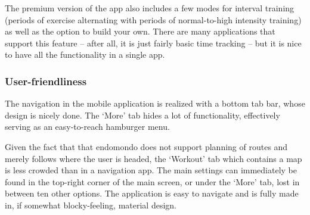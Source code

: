 The premium version of the app also includes a few modes for interval training (periods of exercise alternating with periods of normal-to-high intensity training) as well as the option to build your own.
There are many applications that support this feature -- after all, it is just fairly basic time tracking -- but it is nice to have all the functionality in a single app.
\subsubsection*{User-friendliness}
The navigation in the mobile application is realized with a bottom tab bar, whose design is nicely done.
The `More' tab hides a lot of functionality, effectively serving as an easy-to-reach hamburger menu.

Given the fact that that endomondo does not support planning of routes and merely follows where the user is headed, the `Workout' tab which contains a map is less crowded than in a navigation app.
The main settings can immediately be found in the top-right corner of the main screen, or under the `More' tab, lost in between ten other options.
The application is easy to navigate and is fully made in, if somewhat blocky-feeling, material design.


